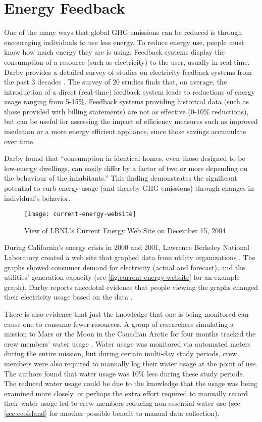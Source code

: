 \section{Energy Feedback}

One of the many ways that global GHG emissions can be reduced is through encouraging individuals to use less energy. To reduce energy use, people must know how much energy they are is using. Feedback systems display the consumption of a resource (such as electricity) to the user, usually in real time. Darby provides a detailed survey of studies on electricity feedback systems from the past 3 decades \cite{darby-review-2006}. The survey of 20 studies finds that, on average, the introduction of a direct (real-time) feedback system leads to reductions of energy usage ranging from 5-15\%. Feedback systems providing historical data (such as those provided with billing statements) are not as effective (0-10\% reductions), but can be useful for assessing the impact of efficiency measures such as improved insulation or a more energy efficient appliance, since those savings accumulate over time.

Darby found that ``consumption in identical homes, even those designed to be low-energy dwellings, can easily differ by a factor of two or more depending on the behaviour of the inhabitants.'' This finding demonstrates the significant potential to curb energy usage (and thereby GHG emissions) through changes in individual's behavior.

\begin{figure}[htbp]
	\centering
		\texttt{[image: current-energy-website]}
		\caption{View of LBNL's Current Energy Web Site on December 15, 2004}
		\label{fig:current-energy-website}
\end{figure}

During California's energy crisis in 2000 and 2001, Lawrence Berkeley National Laboratory created a web site that graphed data from utility organizations \cite{Bartholomew2008Current-Energy}. The graphs showed consumer demand for electricity (actual and forecast), and the utilities' generation capacity (see \autoref{fig:current-energy-website} for an example graph). Darby reports anecdotal evidence that people viewing the graphs changed their electricity usage based on the data \cite{darby-review-2006}.

There is also evidence that just the knowledge that one is being monitored can cause one to consume fewer resources. A group of researchers simulating a mission to Mars or the Moon in the Canadian Arctic for four months tracked the crew members' water usage \cite{Bamsey2008FMARS}. Water usage was monitored via automated meters during the entire mission, but during certain multi-day study periods, crew members were also required to manually log their water usage at the point of use. The authors found that water usage was 10\% less during these study periods. The reduced water usage could be due to the knowledge that the usage was being examined more closely, or perhaps the extra effort required to manually record their water usage led to crew members reducing non-essential water use (see \autoref{sec:ecoisland} for another possible benefit to manual data collection).

